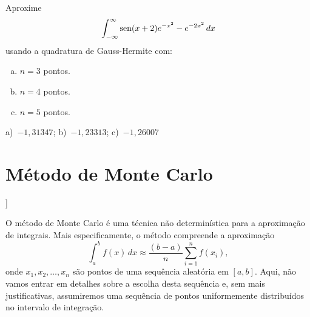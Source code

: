 \begin{exer}\label{exer:GH_fun}
  Aproxime
  \begin{equation}
    \int_{-\infty}^\infty \operatorname{sen}(x+2)e^{-x^2}-e^{-2x^2}\,dx
  \end{equation}
usando a quadratura de Gauss-Hermite com:
\begin{enumerate}[a)]
\item $n=3$ pontos.
\item $n=4$ pontos.
\item $n=5$ pontos.
\end{enumerate}
\end{exer}
\begin{resp}
  a)~$-1,31347$; b)~$-1,23313$; c)~$-1,26007$
\end{resp}

\section{Método de Monte Carlo}\label{cap_integr_sec_Monte_Carlo}

\begin{flushleft}
  [[tag:revisar]]
\end{flushleft}

O método de Monte Carlo é uma técnica não determinística para a aproximação de integrais. Mais especificamente, o método compreende a aproximação
\begin{equation}
  \int_a^b f(x)\,dx \approx \frac{(b-a)}{n}\sum_{i=1}^n f(x_i),
\end{equation}
onde $x_1, x_2, \dotsc, x_n$ são pontos de uma sequência aleatória em $[a, b]$. Aqui, não vamos entrar em detalhes sobre a escolha desta sequência e, sem mais justificativas, assumiremos uma sequência de pontos uniformemente distribuídos no intervalo de integração.

